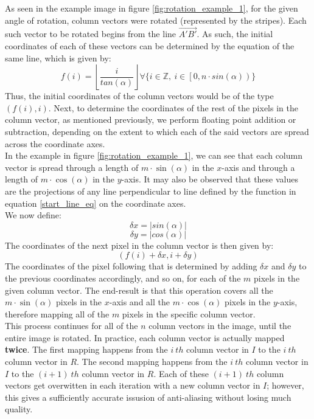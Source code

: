 \documentclass[conference]{IEEEtran}
\begin{document}
As seen in the example image in figure \ref{fig:rotation_example_1}, for the given angle of rotation, column vectors were rotated (represented by the stripes). Each such vector to be rotated begins from the line $\overrightarrow{A'B'}$. As such, the initial coordinates of each of these vectors can be determined by the equation of the same line, which is given by:
\begin{equation}
    \label{start_line_eq}
    f(i) = \left\lfloor \frac{i}{tan(\alpha)} \right\rfloor \forall \{i \in \mathbb{Z},\> i \in \left[ 0, n \cdot sin(\alpha) \right)\}
\end{equation}
Thus, the initial coordinates of the column vectors would be of the type $(f(i), i)$. Next, to determine the coordinates of the rest of the pixels in the column vector, as mentioned previously, we perform floating point addition or subtraction, depending on the extent to which each of the said vectors are spread across the coordinate axes.\\
In the example in figure \ref{fig:rotation_example_1}, we can see that each column vector is spread through a length of $m \cdot \sin(\alpha)$ in the $x$-axis and through a length of $m \cdot \cos(\alpha)$ in the $y$-axis. It may also be observed that these values are the projections of any line perpendicular to line defined by the function in equation \ref{start_line_eq} on the coordinate axes.\\
We now define:
$$\delta x = \left\lvert sin(\alpha)\right\rvert$$
$$\delta y = \left\lvert cos(\alpha)\right\rvert$$
The coordinates of the next pixel in the column vector is then given by:
$$(f(i) + \delta x, i + \delta y)$$
The coordinates of the pixel following that is determined by adding $\delta x$ and $\delta y$ to the previous coordinates accordingly, and so on, for each of the $m$ pixels in the given column vector. The end-result is that this operation covers all the $m \cdot \sin(\alpha)$ pixels in the $x$-axis and all the $m \cdot \cos(\alpha)$ pixels in the $y$-axis, therefore mapping all of the $m$ pixels in the specific column vector.\\
This process continues for all of the $n$ column vectors in the image, until the entire image is rotated. In practice, each column vector is actually mapped \textbf{twice}. The first mapping happens from the $i\>th$ column vector in $I$ to the $i\>th$ column vector in $R$. The second mapping happens from the $i\>th$ column vector in $I$ to the $(i+1)\>th$ column vector in $R$. Each of these $(i+1)\>th$ column vectors get overwitten in each iteration with a new column vector in $I$; however, this gives a sufficiently accurate issusion of anti-aliasing without losing much quality.
\end{document}
